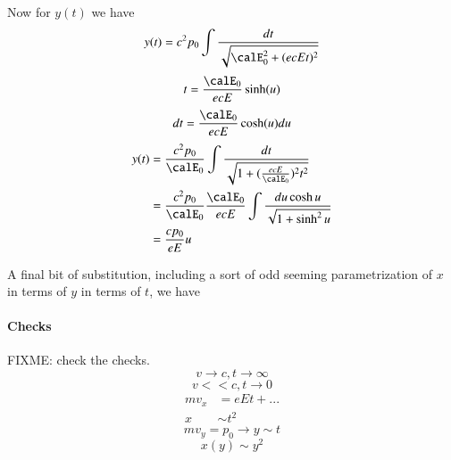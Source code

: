 {Now for \(y(t)\) we have
%
\begin{equation}\label{eqn:relativisticElectrodynamicsT3:340}
y(t) = c^2 p_0 \int \frac{dt}{ \sqrt{\calE_0^2 + (e c E t)^2 }}
\end{equation}
%
\begin{equation}\label{eqn:relativisticElectrodynamicsT3:360}
t = \frac{\calE_0}{ e c E} \sinh(u)
\end{equation}
%
\begin{equation}\label{eqn:relativisticElectrodynamicsT3:380}
dt = \frac{\calE_0}{ e c E} \cosh(u) du
\end{equation}
%
\begin{equation}\label{eqn:relativisticElectrodynamicsT3:970}
\begin{aligned}
y(t)
&= \frac{c^2 p_0}{\calE_0} \int \frac{dt}{\sqrt{1 + (\frac{e c E}{\calE_0})^2 t^2 }} \\
&= \frac{c^2 p_0}{\calE_0}
\frac{\calE_0}{ e c E}
\int \frac{ du \cosh u }{\sqrt{1 + \sinh^2 u }} \\
&= \frac{c p_0}{ e E} u
\end{aligned}
\end{equation}

A final bit of substitution, including a sort of odd seeming parametrization of \(x\) in terms of \(y\) in terms of \(t\), we have
%
\paragraph{Checks}
%
FIXME: check the checks.
%
\begin{equation}\label{eqn:relativisticElectrodynamicsT3:420}
v \rightarrow c, t \rightarrow \infty
\end{equation}
%
\begin{equation}\label{eqn:relativisticElectrodynamicsT3:440}
v << c, t \rightarrow 0
\end{equation}
%
\begin{equation}\label{eqn:relativisticElectrodynamicsT3:990}
\begin{aligned}
m v_x &= e E t + ... \\
x &\sim t^2
\end{aligned}
\end{equation}
%
\begin{equation}\label{eqn:relativisticElectrodynamicsT3:460}
m v_y = p_0 \rightarrow y \sim t
\end{equation}
%
\begin{equation}\label{eqn:relativisticElectrodynamicsT3:480}
x(y) \sim y^2
\end{equation}

}
